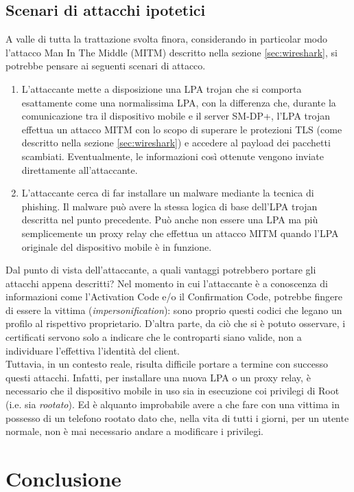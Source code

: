 \documentclass[10pt, oneside]{book}
\begin{document}
\section{Scenari di attacchi ipotetici}
A valle di tutta la trattazione svolta finora, considerando in particolar modo l'attacco Man In The Middle (MITM) descritto nella sezione \ref{sec:wireshark}, si potrebbe pensare ai seguenti scenari di attacco.
\begin{enumerate}
\item L'attaccante mette a disposizione una LPA trojan che si comporta esattamente come una normalissima LPA, con la differenza che, durante la comunicazione tra il dispositivo mobile e il server SM-DP+, l'LPA trojan effettua un attacco MITM con lo scopo di superare le protezioni TLS (come descritto nella sezione \ref{sec:wireshark}) e accedere al payload dei pacchetti scambiati. Eventualmente, le informazioni così ottenute vengono inviate direttamente all'attaccante.
\item L'attaccante cerca di far installare un malware mediante la tecnica di phishing. Il malware può avere la stessa logica di base dell'LPA trojan descritta nel punto precedente. Può anche non essere una LPA ma più semplicemente un proxy relay che effettua un attacco MITM quando l'LPA originale del dispositivo mobile è in funzione.
\end{enumerate}
Dal punto di vista dell'attaccante, a quali vantaggi potrebbero portare gli attacchi appena descritti? Nel momento in cui l'attaccante è a conoscenza di informazioni come l'Activation Code e/o il Confirmation Code, potrebbe fingere di essere la vittima (\textit{impersonification}): sono proprio questi codici che legano un profilo al rispettivo proprietario. D'altra parte, da ciò che si è potuto osservare, i certificati servono solo a indicare che le controparti siano valide, non a individuare l'effettiva l'identità del client.\\

\noindent Tuttavia, in un contesto reale, risulta difficile portare a termine con successo questi attacchi. Infatti, per installare una nuova LPA o un proxy relay, è necessario che il dispositivo mobile in uso sia in esecuzione coi privilegi di Root (i.e. sia \textit{rootato}). Ed è alquanto improbabile avere a che fare con una vittima in possesso di un telefono rootato dato che, nella vita di tutti i giorni, per un utente normale, non è mai necessario andare a modificare i privilegi.

\chapter{Conclusione}
\end{document}
